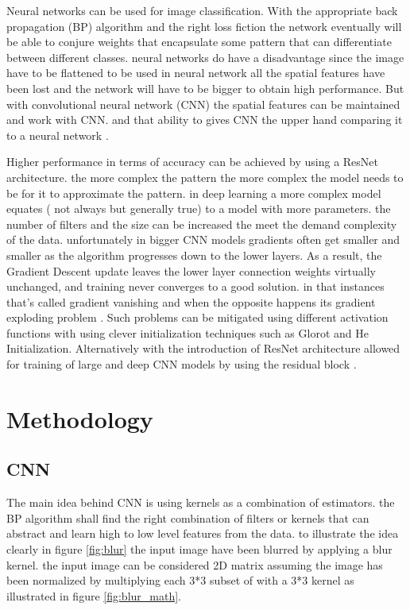 \documentclass[10pt,twocolumn,letterpaper]{article}
\begin{document}
Neural networks can be used for image classification. With the appropriate back propagation (BP) algorithm and the right loss fiction the network eventually will be able to conjure weights that encapsulate some pattern that can differentiate between different classes. neural networks do have a disadvantage since the image have to be flattened to be used in neural network all the spatial features have been lost and the network will have to be bigger to obtain high performance. But with convolutional neural network (CNN) the spatial features can be maintained and work with CNN. and that ability to gives CNN the upper hand comparing it to a neural network \cite{cnn_1_lee}.

 Higher performance in terms of accuracy can be achieved by using a ResNet architecture. the more complex the pattern the more complex the model needs to be for it to approximate the pattern. in deep learning a more complex model equates ( not always but generally true) to a model with more parameters. the number of filters and the size can be increased the meet the demand complexity of the data. unfortunately in bigger CNN models gradients often get smaller and  smaller  as  the  algorithm  progresses down to  the  lower  layers. As  a  result, the Gradient Descent update leaves the lower layer connection weights virtually unchanged, and training never converges to a good solution. in that instances that's called gradient vanishing and when the opposite happens its gradient exploding problem \cite{pmlr-v9-glorot10a}. Such problems can be mitigated using different activation functions with using  clever initialization techniques such as Glorot and He Initialization. Alternatively with the introduction of ResNet architecture allowed for training of large and deep CNN models by using the residual block \cite{ResNet}.


\section{Methodology}

\subsection{CNN}
The main idea behind CNN is using kernels as a combination of estimators. the BP algorithm shall find the right combination of filters or kernels that can abstract and learn high to low level features from the data. to illustrate the idea clearly in figure \ref{fig:blur} the input image have been blurred by applying a blur kernel. the input image can be considered 2D matrix assuming the image has been normalized by multiplying each 3*3 subset of  with a 3*3 kernel as illustrated in figure \ref{fig:blur_math}. 
\end{document}

